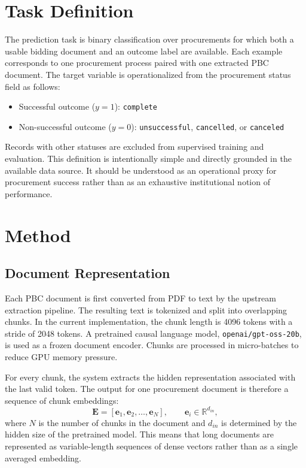 \documentclass[conference]{IEEEtran}
\begin{document}
\section{Task Definition}
The prediction task is binary classification over procurements for which both a usable bidding document and an outcome label are available. Each example corresponds to one procurement process paired with one extracted PBC document. The target variable is operationalized from the procurement status field as follows:

\begin{itemize}
  \item Successful outcome ($y=1$): \texttt{complete}
  \item Non-successful outcome ($y=0$): \texttt{unsuccessful}, \texttt{cancelled}, or \texttt{canceled}
\end{itemize}

Records with other statuses are excluded from supervised training and evaluation. This definition is intentionally simple and directly grounded in the available data source. It should be understood as an operational proxy for procurement success rather than as an exhaustive institutional notion of performance.

\section{Method}
\subsection{Document Representation}
Each PBC document is first converted from PDF to text by the upstream extraction pipeline. The resulting text is tokenized and split into overlapping chunks. In the current implementation, the chunk length is 4096 tokens with a stride of 2048 tokens. A pretrained causal language model, \texttt{openai/gpt-oss-20b}, is used as a frozen document encoder. Chunks are processed in micro-batches to reduce GPU memory pressure.

For every chunk, the system extracts the hidden representation associated with the last valid token. The output for one procurement document is therefore a sequence of chunk embeddings:
\[
\mathbf{E} = [\mathbf{e}_1, \mathbf{e}_2, \dots, \mathbf{e}_N], \qquad \mathbf{e}_i \in \mathbb{R}^{d_{in}},
\]
where $N$ is the number of chunks in the document and $d_{in}$ is determined by the hidden size of the pretrained model. This means that long documents are represented as variable-length sequences of dense vectors rather than as a single averaged embedding.
\end{document}
